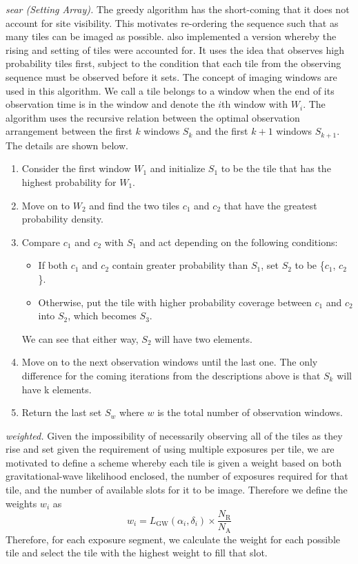 \documentclass[twocolumn]{aastex61}
\begin{document}
\emph{sear (Setting Array).} The greedy algorithm has the short-coming that it does not account for site visibility. This motivates re-ordering the sequence such that as many tiles can be imaged as possible.
\cite{RaSi2017} also implemented a version whereby the rising and setting of tiles were accounted for. It uses the idea that observes high probability tiles first, subject to the condition that each tile from the observing sequence must be observed before it sets. The concept of imaging windows are used in this algorithm. We call a tile belongs to a window when the end of its observation time is in the window and denote the $i$th window with $W_i$. The algorithm uses the recursive relation between the optimal observation arrangement between the first $k$ windows $S_k$ and the first $k + 1$ windows $S_{k+1}$. The details are shown below. 
\begin{enumerate}
\item Consider the first window $W_1$ and initialize $S_1$ to be the tile that has the highest probability for $W_1$.
\item Move on to $W_2$ and find the two tiles $c_1$ and $c_2$ that have the greatest probability density.
\item Compare $c_1$ and $c_2$ with $S_1$ and act depending on the following conditions:
\begin{itemize}
\item If both $c_1$ and $c_2$ contain greater probability than $S_1$, set $S_2$ to be \{$c_1$, $c_2$\}.
\item Otherwise, put the tile with higher probability coverage between $c_1$ and $c_2$ into $S_2$, which becomes $S_3$.
\end{itemize}
We can see that either way, $S_2$ will have two elements.
\item Move on to the next observation windows until the last one. The only difference for the coming iterations from the descriptions above is that $S_k$ will have k elements.
\item Return the last set $S_w$ where $w$ is the total number of observation windows.
\end{enumerate}

\emph{weighted.} Given the impossibility of necessarily observing all of the tiles as they rise and set given the requirement of using multiple exposures per tile, we are motivated to define a scheme whereby each tile is given a weight based on both gravitational-wave likelihood enclosed, the number of exposures required for that tile, and the number of available slots for it to be image. Therefore we define the weights $w_i$ as
\begin{equation}
w_i = L_\textrm{GW}(\alpha_i,\delta_i) \times \frac{N_\textrm{R}}{N_\textrm{A}} 
\end{equation}
Therefore, for each exposure segment, we calculate the weight for each possible tile and select the tile with the highest weight to fill that slot.
\end{document}
